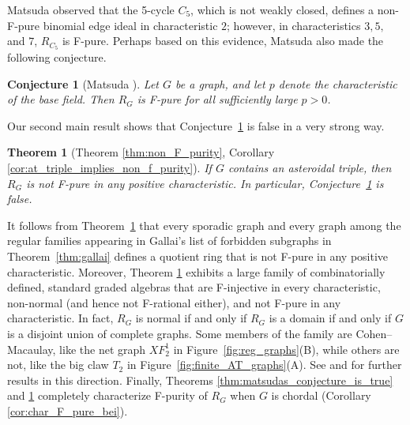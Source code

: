 \documentclass[12pt,a4paper]{amsart}
\theoremstyle{plain}
\newtheorem{theoremx}{Theorem}
\newtheorem{conjx}{Conjecture}
\theoremstyle{definition}
\theoremstyle{remark}
\begin{document}
Matsuda observed that the 5-cycle $C_5$, which is not weakly closed, defines a non-F-pure binomial edge ideal in characteristic $2$; however, in characteristics $3,5,$ and $7$, $R_{C_5}$ is F-pure.  Perhaps based on this evidence, Matsuda also made the following conjecture.

\begin{conjx}[Matsuda {\cite[Conjecture 2.9]{matsuda2018weakly}}]
\label{conj:bei_are_eventually_F_pure}
Let $G$ be a graph, and let $p$ denote the characteristic of the base field. Then $R_{G}$ is F-pure for all sufficiently large $p > 0$.
\end{conjx}

\noindent Our second main result shows that Conjecture~\ref{conj:bei_are_eventually_F_pure} is false in a very strong way.

\begin{theoremx}[Theorem \ref{thm:non_F_purity}, Corollary \ref{cor:at_triple_implies_non_f_purity}]
\label{thm:intro_non_f_purity}
If $G$ contains an asteroidal triple, then $R_{G}$ is not F-pure in any positive characteristic.  In particular, Conjecture~\ref{conj:bei_are_eventually_F_pure} is false.
\end{theoremx}

\noindent It follows from Theorem~\ref{thm:intro_non_f_purity} that every sporadic graph and every graph among the regular families appearing in Gallai's list of forbidden subgraphs in Theorem~\ref{thm:gallai} defines a quotient ring that is not F-pure in any positive characteristic. Moreover, Theorem \ref{thm:intro_non_f_purity} exhibits a large family of combinatorially defined, standard graded algebras that are F-injective in every characteristic, non-normal (and hence not F-rational either), and not F-pure in any characteristic. In fact, $R_G$ is normal if and only if $R_G$ is a domain if and only if $G$ is a disjoint union of complete graphs. 
 Some members of the family are Cohen--Macaulay, like the net graph $XF_2^1$ in Figure~\ref{fig:reg_graphs}(B), while others are not, like the big claw $T_2$ in Figure~\ref{fig:finite_AT_graphs}(A). See \cite{fedder1983} and \cite{kurano2009multigraded} for further results in this direction. Finally, Theorems \ref{thm:matsudas_conjecture_is_true} and \ref{thm:intro_non_f_purity} completely characterize F-purity of $R_G$ when $G$ is chordal (Corollary \ref{cor:char_F_pure_bei}).
\end{document}
